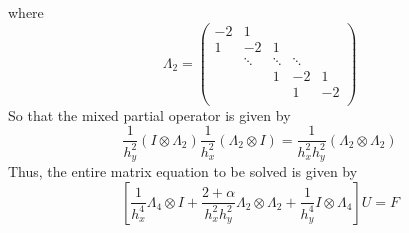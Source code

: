 \documentclass[reqno]{article}
\begin{document}
	where
	\begin{equation}
		 \Lambda_2 = \begin{pmatrix}
		 -2 & 1\\
		 1 & -2 & 1\\
		 &\ddots&\ddots&\ddots\\
		 &&1 & -2 & 1\\
		 &&&1 & -2\\
		 \end{pmatrix}
	\end{equation}
	So that the mixed partial operator is given by
	\begin{equation}
		\frac{1}{h_y^2} \left( I \otimes \Lambda_2 \right) \frac{1}{h_x^2} \left( \Lambda_2 \otimes I \right) = \frac{1}{h_x^2 h_y^2} \left( \Lambda_2 \otimes \Lambda_2 \right)
	\end{equation}
	Thus, the entire matrix equation to be solved is given by
	\begin{equation}
		\left[
		\frac{1}{h_x^4} \Lambda_4 \otimes I + 
		\frac{2 + \alpha}{h_x^2 h_y^2} \Lambda_2 \otimes \Lambda_2 + 
		\frac{1}{h_y^4} I \otimes \Lambda_4\right] U = F
	\end{equation}
	
\end{document}
